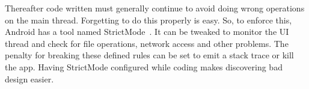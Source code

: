 Thereafter code written must generally continue to avoid doing wrong operations on the main thread. Forgetting to do this properly is easy. So, to enforce this, Android has a tool named StrictMode~\cite{androidStrictMode}. It can be tweaked to monitor the UI thread and check for file operations, network access and other problems. The penalty for breaking these defined rules can be set to emit a stack trace or kill the app. Having StrictMode configured while coding makes discovering bad design easier. 

